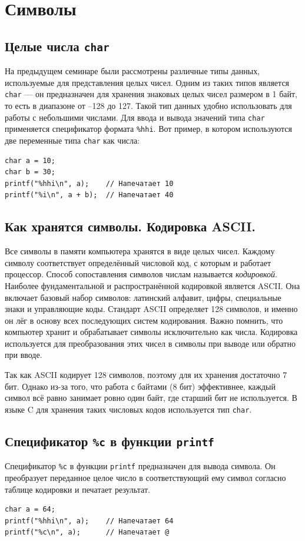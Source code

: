 \documentclass{article}
\begin{document}
\section*{Символы}
\subsection*{Целые числа \texttt{char}}
На предыдущем семинаре были рассмотрены различные типы данных, используемые для представления целых чисел. Одним из таких типов является \texttt{char} — он предназначен для хранения знаковых целых чисел размером в 1 байт, то есть в диапазоне от –128 до 127. Такой тип данных удобно использовать для работы с небольшими числами. Для ввода и вывода значений типа \texttt{char} применяется спецификатор формата \texttt{\%hhi}. Вот пример, в котором используются две переменные типа \texttt{char} как числа:
\begin{lstlisting}
char a = 10;
char b = 30;
printf("%hhi\n", a);    // Напечатает 10
printf("%i\n", a + b);  // Напечатает 40
\end{lstlisting}


\subsection*{Как хранятся символы. Кодировка ASCII.}
Все символы в памяти компьютера хранятся в виде целых чисел. Каждому символу соответствует определённый числовой код, с которым и работает процессор. Способ сопоставления символов числам называется \textit{кодировкой}. Наиболее фундаментальной и распространённой кодировкой является ASCII. Она включает базовый набор символов: латинский алфавит, цифры, специальные знаки и управляющие коды. Стандарт ASCII определяет 128 символов, и именно он лёг в основу всех последующих систем кодирования. Важно помнить, что компьютер хранит и обрабатывает символы исключительно как числа. Кодировка используется для преобразования этих чисел в символы при выводе или обратно при вводе.

Так как ASCII кодирует 128 символов, поэтому для их хранения достаточно 7 бит. Однако из-за того, что работа с байтами (8 бит) эффективнее, каждый символ всё равно занимает ровно один байт, где старший бит не используется. В языке C для хранения таких числовых кодов используется тип \texttt{char}.

\subsection*{Спецификатор \texttt{\%c} в функции \texttt{printf}}
Спецификатор \texttt{\%c} в функции \texttt{printf} предназначен для вывода символа. Он преобразует переданное целое число в соответствующий ему символ согласно таблице кодировки и печатает результат.
\begin{lstlisting}
char a = 64;
printf("%hhi\n", a);	// Напечатает 64
printf("%c\n", a);		// Напечатает @
\end{lstlisting}
\end{document}
